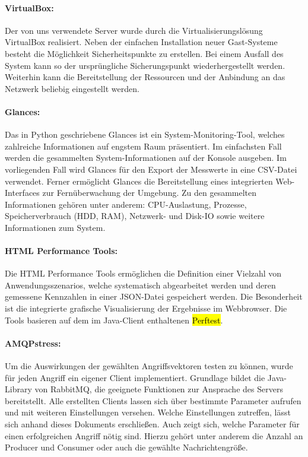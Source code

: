 \documentclass[	a4paper,
			11pt,
			oneside,
			parskip]{scrartcl}
\begin{document}
	\paragraph{VirtualBox:} Der von uns verwendete Server wurde durch die Virtualisierungslösung VirtualBox realisiert. Neben der einfachen Installation neuer Gast-Systeme besteht die Möglichkeit Sicherheitspunkte zu erstellen. Bei einem Ausfall des System kann so der ursprüngliche Sicherungspunkt wiederhergestellt werden. Weiterhin kann die Bereitstellung der Ressourcen und der Anbindung an das Netzwerk beliebig eingestellt werden.
	
	\paragraph{Glances:} Das in Python geschriebene Glances ist ein System-Monitoring-Tool, welches zahlreiche Informationen auf engstem Raum präsentiert. Im einfachsten Fall werden die gesammelten System-Informationen auf der Konsole ausgeben.
	 Im vorliegenden Fall wird Glances für den Export der Messwerte in eine CSV-Datei verwendet. Ferner ermöglicht Glances die Bereitstellung eines integrierten Web-Interfaces zur Fernüberwachung der Umgebung.
	 Zu den gesammelten Informationen gehören unter anderem: CPU-Auslastung, Prozesse, Speicherverbrauch (HDD, RAM), Netzwerk- und Disk-IO sowie weitere Informationen zum System.

	\paragraph{HTML Performance Tools:} Die HTML Performance Tools ermöglichen die Definition einer Vielzahl von Anwendungsszenarios, welche systematisch abgearbeitet werden und deren gemessene Kennzahlen in einer JSON-Datei gespeichert werden. Die Besonderheit ist die integrierte grafische Visualisierung der Ergebnisse im Webbrowser. Die Tools basieren auf dem im Java-Client enthaltenen \hl{Perftest}.
	
	\paragraph{AMQPstress:} Um die Auswirkungen der gewählten Angriffsvektoren testen zu können, wurde für jeden Angriff ein eigener Client implementiert. Grundlage bildet die Java-Library von RabbitMQ, die geeignete Funktionen zur Ansprache des Servers bereitstellt. Alle erstellten Clients lassen sich über bestimmte Parameter aufrufen und mit weiteren Einstellungen versehen. Welche Einstellungen zutreffen, lässt sich anhand dieses Dokuments erschließen. Auch zeigt sich, welche Parameter für einen erfolgreichen Angriff nötig sind. Hierzu gehört unter anderem die Anzahl an Producer und Consumer oder auch die gewählte Nachrichtengröße.
\end{document}
